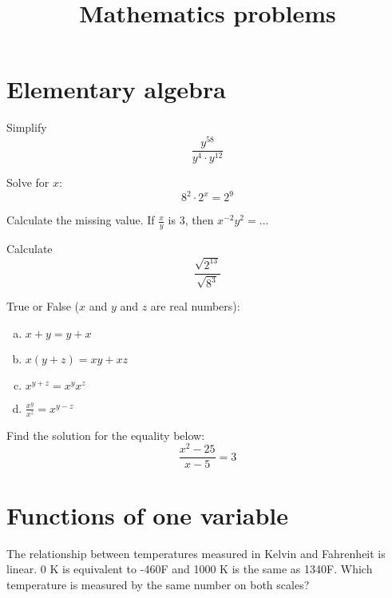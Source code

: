 \documentclass[10pt]{article}
\newenvironment{problem}[2][Problem]{\begin{trivlist}
\item[\hskip \labelsep {\bfseries #1}\hskip \labelsep {\bfseries #2.}]}{\end{trivlist}}
\begin{document}
 
\title{Mathematics problems}
\date{}
\maketitle

 \section{Elementary algebra}
 
\begin{problem}{1.1}
Simplify $$\frac{y^{58}}{y^4 \cdot y^{12}}$$
\end{problem}

\begin{problem}{1.2}
Solve for $x$:
$$8^2 \cdot 2^x = 2^9$$
\end{problem}

\begin{problem}{1.3}
Calculate the missing value. If $\frac{x}{y}$ is 3, then $x^{-2}y^{2}=\dots$
\end{problem}

\begin{problem}{1.4}
Calculate
$$\frac{\sqrt{2^{13}}}{\sqrt{8^3}}$$
\end{problem}

\begin{problem}{1.5}
True or False ($x$ and $y$ and $z$ are real numbers):
\begin{enumerate}[(a)]
    \item $x+y=y+x$
    \item $x(y+z)=xy+xz$
    \item $x^{y+z}=x^yx^z$
    \item $\frac{x^y}{x^z}=x^{y-z}$
\end{enumerate}
\end{problem}

\begin{problem}{1.6}
Find the solution for the equality below:
$$\frac{x^2-25}{x-5}=3$$
\end{problem}

\section{Functions of one variable}

\begin{problem}{2.1 (Based on SYD 2.5.6)}
The relationship between temperatures measured in Kelvin and Fahrenheit is linear. 0 K is equivalent to -460\degree F and 1000 K is the same as 1340\degree F.
 Which temperature is measured by the same number on both scales?
\end{problem}
\end{document}
